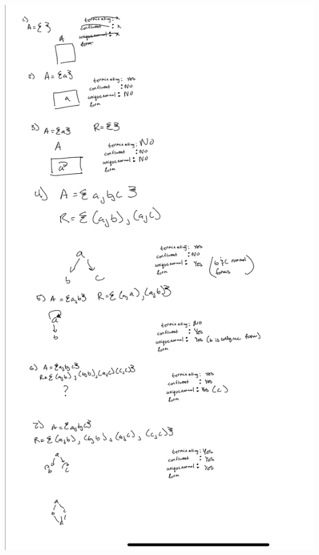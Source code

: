 \documentclass{article}
\theoremstyle{theorem}
\theoremstyle{definition}
\theoremstyle{remark}
\begin{document}
\begin{center}
\item \includegraphics[scale=0.2]{hw7.jpg}
\end{center}
\end{document}
